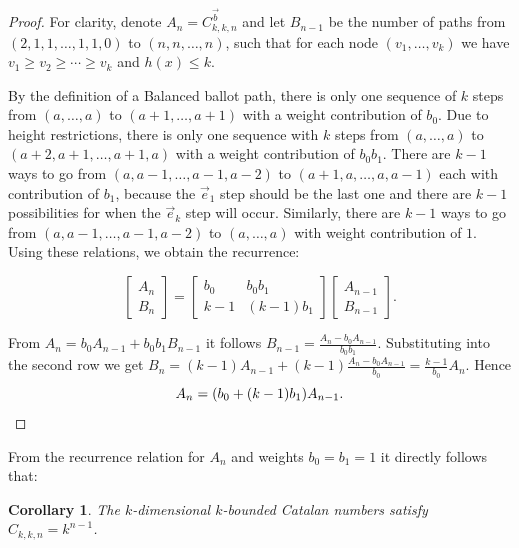 \documentclass[12pt,notitlepage]{amsart}
\newtheorem*{corollary*}{Corollary}
\numberwithin{equation}{section}
\theoremstyle{thmstyleone}%
\theoremstyle{thmstyletwo}%
\theoremstyle{thmstylethree}%
\numberwithin{theorem}{section}
\numberwithin{equation}{section}
\begin{document}
\begin{proof}
    For clarity, denote $A_n = C^{\vec{b}}_{k,k,n}$ and let $B_{n-1}$ be the number of paths from $(2,1,1,\ldots,1,1,0)$ to $(n,n,\ldots,n)$, such that for each node $(v_1,\ldots,v_k)$ we have $v_1 \geq v_2 \geq \cdots \geq v_k$ and $h(x) \leq k$.

    By the definition of a Balanced ballot path, there is only one sequence of $k$ steps from $(a,\ldots, a)$ to $(a+1, \ldots, a+1)$ with a weight contribution of $b_0$. Due to height restrictions, there is only one sequence with $k$ steps from $(a,\ldots, a)$ to $(a+2, a+1, \ldots, a+1,a)$ with a weight contribution of $b_0b_1$. There are $k-1$ ways to go from $(a,a-1,\ldots,a-1,a-2)$ to $(a+1,a,\ldots,a,a-1)$ each with contribution of $b_1$, because the $\vec{e}_1$ step should be the last one and there are $k-1$ possibilities for when the $\vec{e}_k$ step will occur. Similarly, there are $k-1$ ways to go from $(a,a-1,\ldots,a-1,a-2)$ to $(a,\ldots, a)$ with weight contribution of $1$. Using these relations, we obtain the recurrence:
    
    
     \[ \begin{bmatrix}
A_{n}\\
B_{n}
\end{bmatrix} = \begin{bmatrix}
b_0 & b_0b_1 \\
k-1 & (k-1)b_1 \end{bmatrix}
\begin{bmatrix} A_{n-1} \\ B_{n-1} \end{bmatrix}. \]

From $A_n = b_0A_{n-1} + b_0b_1B_{n-1}$ it follows $\displaystyle B_{n-1} = \frac{A_n -b_0A_{n-1}}{b_0b_1}$. Substituting into the second row we get $\displaystyle B_n = (k-1)A_{n-1} + (k-1)\frac{A_n -b_0A_{n-1}}{b_0} = \frac{k-1}{b_0}A_n$. Hence 
\vspace{-0.5 em} $$A_n = (b_0 + (k-1)b_1)A_{n-1}. \qedhere$$ 
\end{proof}
\vspace{-0.5 em}
From the recurrence relation for $A_n$ and weights $b_0=b_1=1$ it directly follows that:
\begin{corollary*}
    The $k$-dimensional $k$-bounded Catalan numbers satisfy $C_{k,k,n} = k^{n-1}$.
\end{corollary*}
\end{document}
